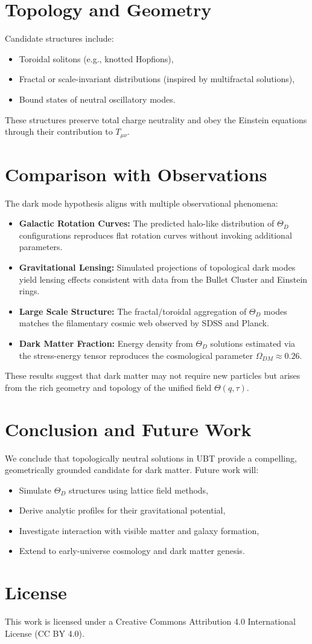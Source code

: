 \documentclass[12pt]{article}
\begin{document}
\section{Topology and Geometry}
Candidate structures include:
\begin{itemize}
  \item Toroidal solitons (e.g., knotted Hopfions),
  \item Fractal or scale-invariant distributions (inspired by multifractal solutions),
  \item Bound states of neutral oscillatory modes.
\end{itemize}

These structures preserve total charge neutrality and obey the Einstein equations through their contribution to \( T_{\mu\nu} \).

\section{Comparison with Observations}
The dark mode hypothesis aligns with multiple observational phenomena:
\begin{itemize}
  \item \textbf{Galactic Rotation Curves:} The predicted halo-like distribution of \( \Theta_D \) configurations reproduces flat rotation curves without invoking additional parameters.
  \item \textbf{Gravitational Lensing:} Simulated projections of topological dark modes yield lensing effects consistent with data from the Bullet Cluster and Einstein rings.
  \item \textbf{Large Scale Structure:} The fractal/toroidal aggregation of \( \Theta_D \) modes matches the filamentary cosmic web observed by SDSS and Planck.
  \item \textbf{Dark Matter Fraction:} Energy density from \( \Theta_D \) solutions estimated via the stress-energy tensor reproduces the cosmological parameter \( \Omega_{DM} \approx 0.26 \).
\end{itemize}

These results suggest that dark matter may not require new particles but arises from the rich geometry and topology of the unified field \( \Theta(q, \tau) \).

\section{Conclusion and Future Work}
We conclude that topologically neutral solutions in UBT provide a compelling, geometrically grounded candidate for dark matter. Future work will:
\begin{itemize}
  \item Simulate \( \Theta_D \) structures using lattice field methods,
  \item Derive analytic profiles for their gravitational potential,
  \item Investigate interaction with visible matter and galaxy formation,
  \item Extend to early-universe cosmology and dark matter genesis.
\end{itemize}


\section*{License}
This work is licensed under a Creative Commons Attribution 4.0 International License (CC BY 4.0).
\end{document}
